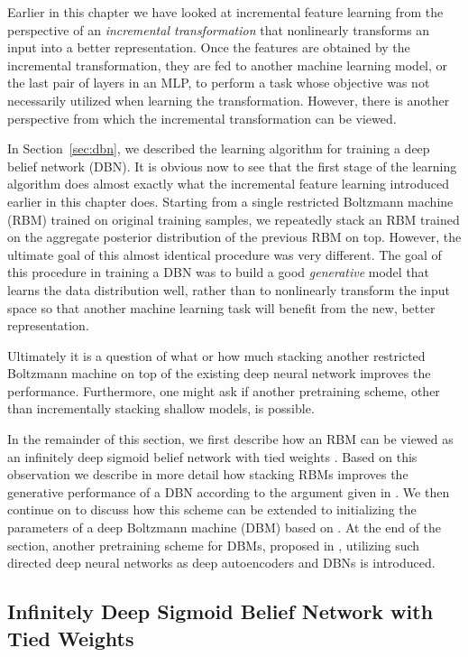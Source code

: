 \documentclass[dissertation,nocontribution,draft*]{aaltoseries}
\begin{document}
Earlier in this chapter we have looked at incremental
feature learning from the perspective of an \textit{incremental
transformation} that nonlinearly transforms an input into a
better representation. Once the features are obtained by
the incremental transformation, they are fed to another
machine learning model, or the last pair of layers in an
MLP, to perform a task whose objective was not necessarily
utilized when learning the transformation. However, there is
another perspective from which the incremental
transformation can be viewed.

In Section~\ref{sec:dbn}, we described the learning
algorithm for training a deep belief network (DBN). It is
obvious now to see that the first stage of the learning
algorithm does almost exactly what the incremental feature
learning introduced earlier in this chapter does. Starting
from a single restricted Boltzmann machine (RBM) trained on
original training samples, we repeatedly stack an RBM
trained on the aggregate posterior distribution of the
previous RBM on top.  However, the ultimate goal of this
almost identical procedure was very different.  The goal of
this procedure in training a DBN was to build a good
\textit{generative} model that learns the data distribution
well, rather than to nonlinearly transform the input space
so that another machine learning task will benefit from the
new, better representation.

Ultimately it is a question of what or how much
stacking another restricted Boltzmann machine on top of the
existing deep neural network improves the performance.
Furthermore, one might ask if another pretraining scheme,
other than incrementally stacking shallow models, is
possible.

In the remainder of this section, we first describe how an
RBM can be viewed as an infinitely deep sigmoid belief
network with tied weights \citep{Hinton2006nc}. Based on
this observation we describe in more detail how stacking
RBMs improves the generative performance of a DBN according
to the argument given in
\citep{Hinton2006nc,Salakhutdinov2012nc}.  We then continue
on to discuss how this scheme can be extended to
initializing the parameters of a deep Boltzmann machine
(DBM) based on
\citep{Salakhutdinov2012nc,Salakhutdinov2012}. At the end of
the section, another pretraining scheme for DBMs, proposed in
, utilizing such directed deep neural
networks as deep autoencoders and DBNs is introduced.


\subsection{Infinitely Deep Sigmoid Belief Network with
Tied Weights}
\label{sec:inf_sbn_rbm}
\end{document}
